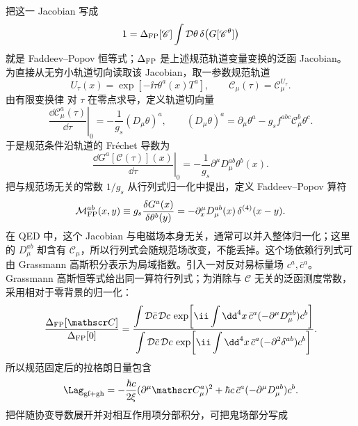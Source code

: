 把这一 Jacobian 写成
\begin{equation*}
 1=\Delta_{\rm FP}[\mathscr C]
 \int\mathcal D\theta\,
 \delta\!\left(G[\mathscr C^\theta]\right)
\end{equation*}
就是 Faddeev--Popov 恒等式；$\Delta_{\rm FP}$ 是上述规范轨道变量变换的泛函 Jacobian。为直接从无穷小轨道切向读取该 Jacobian，取一参数规范轨道
\begin{equation*}
 U_\tau(x)=\exp[-\ii\tau\theta^a(x)T^a],
 \qquad \mathscr C_\mu(\tau)=\mathscr C_\mu^{U_\tau}.
\end{equation*}
由有限变换律 对 $\tau$ 在零点求导，定义轨道切向量
\begin{equation*}
 \left.\frac{\dd\mathscr C_\mu^a(\tau)}{\dd\tau}\right|_0
 =-\frac1{g_s}(D_\mu\theta)^a,
 \qquad
 (D_\mu\theta)^a
 =\partial_\mu\theta^a-g_sf^{abc}\mathscr C_\mu^b\theta^c.
\end{equation*}
于是规范条件沿轨道的 Fr\'echet 导数为
\begin{equation*}
 \left.\frac{\dd G^a[\mathscr C(\tau)](x)}{\dd\tau}\right|_0
 =-\frac1{g_s}\partial^\mu D_\mu^{ab}\theta^b(x).
\end{equation*}
把与规范场无关的常数 $1/g_s$ 从行列式归一化中提出，定义 Faddeev--Popov 算符
\begin{equation}
 {
 \mathcal M_{\rm FP}^{ab}(x,y)
 \equiv
 g_s\frac{\delta G^a(x)}{\delta\theta^b(y)}
 =-\partial_x^\mu D_\mu^{ab}(x)\,\delta^{(4)}(x-y).}
 \label{eq:qcd-fp-operator-dp10}
\end{equation}
在 QED 中，这个 Jacobian 与电磁场本身无关，通常可以并入整体归一化；这里的 $D_\mu^{ab}$ 却含有 $\mathscr C_\mu$，所以行列式会随规范场改变，不能丢掉。这个场依赖行列式可由 Grassmann 高斯积分表示为局域指数。引入一对反对易标量场 $c^a,\bar c^a$。Grassmann 高斯恒等式给出同一算符行列式；为消除与 $\mathscr C$ 无关的泛函测度常数，采用相对于零背景的归一化：
\begin{equation*}
 {
 \frac{\Delta_{\rm FP}[\mathscr C]}{\Delta_{\rm FP}[0]}
 =
 \frac{
 \displaystyle\int\mathcal D\bar c\,\mathcal Dc\,
 \exp\!\left[
 \ii\int\dd^4x\,\bar c^a(-\partial^\mu D_\mu^{ab})c^b
 \right]}
 {
 \displaystyle\int\mathcal D\bar c\,\mathcal Dc\,
 \exp\!\left[
 \ii\int\dd^4x\,\bar c^a(-\partial^2\delta^{ab})c^b
 \right]}.}
\end{equation*}
所以规范固定后的拉格朗日量包含
\begin{equation}
 \Lag_{\rm gf+gh}
 =-\frac{\hbar c}{2\xi}(\partial^\mu\mathscr C_\mu^a)^2
 +\hbar c\,\bar c^a(-\partial^\mu D_\mu^{ab})c^b.
 \label{eq:qcd-gauge-fixing-ghost-lagrangian-dp10}
\end{equation}
把伴随协变导数展开并对相互作用项分部积分，可把鬼场部分写成


